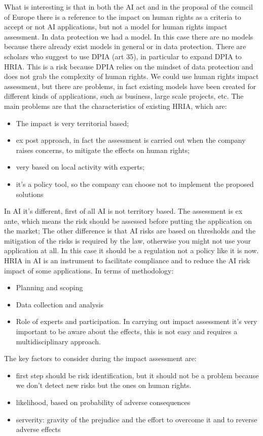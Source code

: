 What is interesting is that in both the AI act and in the proposal of the council of Europe there is a reference to the impact on human rights as a criteria to accept or not AI applications, but not a model for human rights impact assessment. In data protection we had a model. In this case there are no models because there already exist models in general or in data protection. There are scholars who suggest to use DPIA (art 35), in particular to expand DPIA to HRIA. This is a risk because DPIA relies on the mindset of data protection and does not grab the complexity of human rights. We could use human rights impact assessment, but there are problems, in fact existing models have been created for different kinds of applications, such as business, large scale projects, etc. 
The main problems are that the characteristics of existing HRIA, which are:
\begin{itemize}
    \item The impact is very territorial based;
    \item ex post approach, in fact the assessment is carried out when the company raises concerns, to mitigate the effects on human rights;
    \item very based on local activity with experts;
    \item it's a policy tool, so the company can choose not to implement the proposed solutions
\end{itemize}
In AI it's different, first of all AI is not territory based.
The assessment is ex ante, which means the risk should be assessed before putting the application on the market;
The other difference is that AI risks are based on thresholds and the mitigation of the risks is required by the law, otherwise you might not use your application at all. In this case it should be a regulation not a policy like it is now.
HRIA in AI is an instrument to facilitate compliance and to reduce the AI risk impact of some applications. In terms of methodology:
\begin{itemize}
    \item Planning and scoping
    \item Data collection and analysis
    \item Role of experts and participation. In carrying out impact assessment it's very important to be aware about the effects, this is not easy and requires a multidisciplinary approach.
\end{itemize}
The key factors to consider during the impact assessment are:
\begin{itemize} 
    \item first step should be risk identification, but it should not be a problem because we don't detect new risks but the ones on human rights.
    \item likelihood, based on probability of adverse consequences
    \item serverity: gravity of the prejudice and the effort to overcome it and to reverse adverse effects
\end{itemize}
